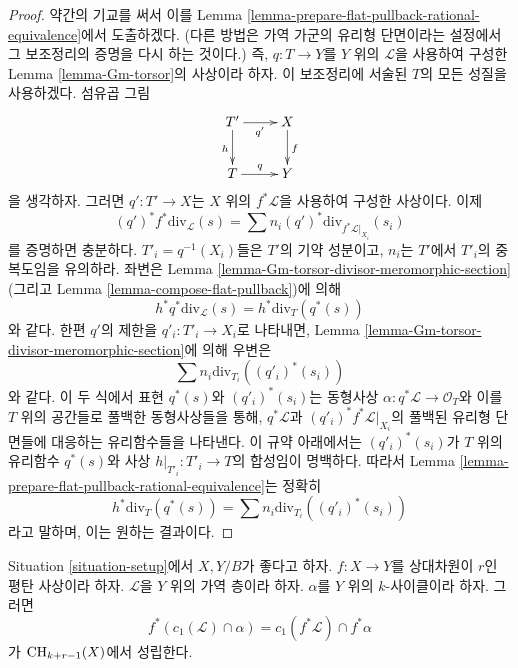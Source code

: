\begin{proof}
약간의 기교를 써서 이를 Lemma
\ref{lemma-prepare-flat-pullback-rational-equivalence}에서 도출하겠다.
(다른 방법은 가역 가군의 유리형 단면이라는 설정에서 그 보조정리의
증명을 다시 하는 것이다.) 즉, $q : T \to Y$를 $Y$ 위의
$\mathcal{L}$을 사용하여 구성한 Lemma \ref{lemma-Gm-torsor}의
사상이라 하자. 이 보조정리에 서술된 $T$의 모든 성질을 사용하겠다.
섬유곱 그림
$$
\xymatrix{
T' \ar[r]_{q'} \ar[d]_h & X \ar[d]^f \\
T \ar[r]^q & Y
}
$$
을 생각하자. 그러면 $q' : T' \to X$는 $X$ 위의
$f^*\mathcal{L}$을 사용하여 구성한 사상이다. 이제
$$
(q')^*f^*\text{div}_\mathcal{L}(s) =
\sum n_i (q')^*\text{div}_{f^*\mathcal{L}|_{X_i}}(s_i)
$$
를 증명하면 충분하다.
$T'_i = q^{-1}(X_i)$들은 $T'$의 기약 성분이고,
$n_i$는 $T'$에서 $T'_i$의 중복도임을 유의하라.
좌변은 Lemma \ref{lemma-Gm-torsor-divisor-meromorphic-section}
(그리고 Lemma \ref{lemma-compose-flat-pullback})에 의해
$$
h^*q^*\text{div}_\mathcal{L}(s) = h^*\text{div}_T(q^*(s))
$$
와 같다. 한편 $q'$의 제한을 $q'_i : T'_i \to X_i$로 나타내면,
Lemma \ref{lemma-Gm-torsor-divisor-meromorphic-section}에 의해
우변은
$$
\sum n_i \text{div}_{T_i}((q'_i)^*(s_i))
$$
와 같다. 이 두 식에서 표현 $q^*(s)$와 $(q'_i)^*(s_i)$는
동형사상 $\alpha : q^*\mathcal{L} \to \mathcal{O}_T$와 이를
$T$ 위의 공간들로 풀백한 동형사상들을 통해,
$q^*\mathcal{L}$과 $(q'_i)^*f^*\mathcal{L}|_{X_i}$의 풀백된 유리형
단면들에 대응하는 유리함수들을 나타낸다. 이 규약 아래에서는
$(q'_i)^*(s_i)$가 $T$ 위의 유리함수 $q^*(s)$와 사상
$h|_{T'_i} : T'_i \to T$의 합성임이 명백하다. 따라서 Lemma
\ref{lemma-prepare-flat-pullback-rational-equivalence}는 정확히
$$
h^*\text{div}_T(q^*(s)) = \sum n_i \text{div}_{T_i}((q'_i)^*(s_i))
$$
라고 말하며, 이는 원하는 결과이다.
\end{proof}

\begin{lemma}
\label{lemma-flat-pullback-cap-c1}
Situation \ref{situation-setup}에서 $X, Y/B$가 좋다고 하자.
$f : X \to Y$를 상대차원이 $r$인 평탄 사상이라 하자.
$\mathcal{L}$을 $Y$ 위의 가역 층이라 하자.
$\alpha$를 $Y$ 위의 $k$-사이클이라 하자. 그러면
$$
f^*(c_1(\mathcal{L}) \cap \alpha) = c_1(f^*\mathcal{L}) \cap f^*\alpha
$$
가 $\mathop{\mathrm{CH}}\nolimits_{k + r - 1}(X)$에서 성립한다.
\end{lemma}

